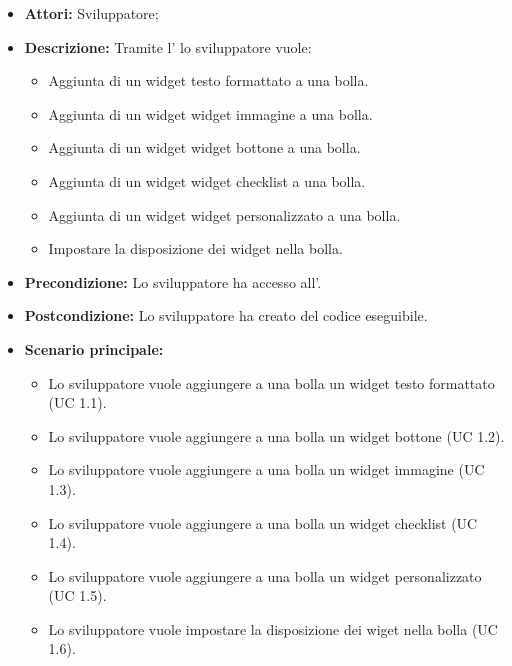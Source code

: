 \FloatBarrier
\begin{itemize}
\item \textbf{Attori:} Sviluppatore;
\item \textbf{Descrizione:} Tramite l' lo sviluppatore vuole:
	\begin{itemize}
	\item{Aggiunta di un widget testo formattato a una bolla.} 
	\item{Aggiunta di un widget widget immagine a una bolla.}
	\item{Aggiunta di un widget widget bottone a una bolla.}
	\item{Aggiunta di un widget widget checklist a una bolla.}
	\item{Aggiunta di un widget widget personalizzato a una bolla.}
	\item{Impostare la disposizione dei widget nella bolla.}
	\end{itemize} 
\item \textbf{Precondizione:} Lo sviluppatore ha accesso all'.
\item \textbf{Postcondizione:} Lo sviluppatore ha creato del codice eseguibile. 
\item \textbf{Scenario principale:}
	\begin{itemize}
	\item{Lo sviluppatore vuole aggiungere a una bolla un widget testo formattato (UC 1.1).}
	\item{Lo sviluppatore vuole aggiungere a una bolla un widget bottone (UC 1.2).}
	\item{Lo sviluppatore vuole aggiungere a una bolla un widget immagine (UC 1.3).}
	\item{Lo sviluppatore vuole aggiungere a una bolla un widget checklist (UC 1.4).}
	\item{Lo sviluppatore vuole aggiungere a una bolla un widget personalizzato (UC 1.5).}
	\item{Lo sviluppatore vuole impostare la disposizione dei wiget nella bolla (UC 1.6).}
	\end{itemize}
\end{itemize}